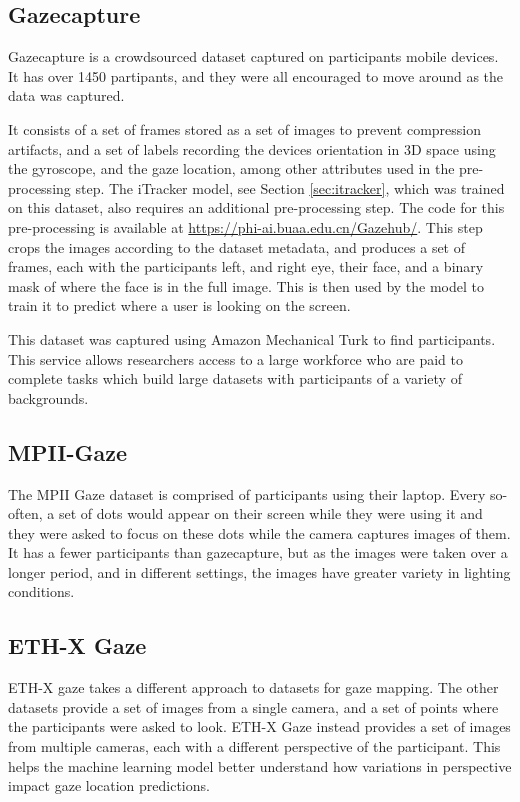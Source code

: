 \documentclass[twocolumn]{report}
\begin{document}
\subsection{Gazecapture}

Gazecapture \cite{krafka2016eye} is a crowdsourced dataset captured on participants mobile devices. It has over 1450 partipants, and they were all encouraged to move around as the data was captured. 

It consists of a set of frames stored as a set of images to prevent compression artifacts, and a set of labels recording the devices orientation in 3D space using the gyroscope, and the gaze location, among other attributes used in the pre-processing step. The iTracker model, see Section \ref{sec:itracker}, which was trained on this dataset, also requires an additional pre-processing step. The code for this pre-processing is available at \url{https://phi-ai.buaa.edu.cn/Gazehub/}. This step crops the images according to the dataset metadata, and produces a set of frames, each with the participants left, and right eye, their face, and a binary mask of where the face is in the full image. This is then used by the model to train it to predict where a user is looking on the screen. 

This dataset was captured using Amazon Mechanical Turk \cite{mturk} to find participants. This service allows researchers access to a large workforce who are paid to complete tasks which build large datasets with participants of a variety of backgrounds. 

\subsection{MPII-Gaze}

The MPII Gaze dataset is comprised of participants using their laptop. Every so-often, a set of dots would appear on their screen while they were using it and they were asked to focus on these dots while the camera captures images of them. It has a fewer participants than gazecapture, but as the images were taken over a longer period, and in different settings, the images have greater variety in lighting conditions.  

\subsection{ETH-X Gaze}

ETH-X gaze takes a different approach to datasets for gaze mapping. The other datasets provide a set of images from a single camera, and a set of points where the participants were asked to look. ETH-X Gaze instead provides a set of images from multiple cameras, each with a different perspective of the participant. This helps the machine learning model better understand how variations in perspective impact gaze location predictions. 
\end{document}
